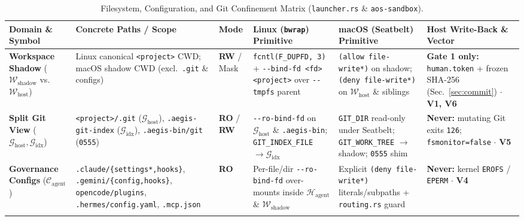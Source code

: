 \documentclass[10pt,journal,compsoc]{IEEEtran}
\begin{document}
\begin{table}[!t]
\centering
\caption{Filesystem, Configuration, and Git Confinement Matrix (\texttt{launcher.rs} \& \texttt{aos-sandbox}).}
\label{tab:vfs_map}
\vspace{-4pt}
\scriptsize
\setlength{\tabcolsep}{3.1pt}
\begin{tabularx}{\textwidth}{@{}>{\raggedright\arraybackslash}p{2.30cm}>{\raggedright\arraybackslash}p{3.10cm}lYY>{\raggedright\arraybackslash}p{2.95cm}@{}}
\toprule
\textbf{Domain \& Symbol} & \textbf{Concrete Paths / Scope} & \textbf{Mode} & \textbf{Linux (\texttt{bwrap}) Primitive} & \textbf{macOS (Seatbelt) Primitive} & \textbf{Host Write-Back \& Vector} \\
\midrule
\textbf{Workspace Shadow} ($\mathcal{W}_{\text{shadow}}$ vs.\ $\mathcal{W}_{\text{host}}$) & Linux canonical \texttt{<project>} CWD; macOS shadow CWD (excl.\ \texttt{.git} \& configs) & \textbf{RW} / Mask & \texttt{fcntl(F\_DUPFD, 3)} + \texttt{-\/-bind-fd <fd> <project>} over \texttt{-\/-tmpfs} parent & \texttt{(allow file-write*)} on shadow; \texttt{(deny file-write*)} on $\mathcal{W}_{\text{host}}$ \& siblings & \textbf{Gate 1 only:} \texttt{human.token} + frozen SHA-256 (Sec.~\ref{sec:commit}) $\cdot$ \textbf{V1, V6} \\
\addlinespace[2pt]
\textbf{Split Git View} ($\mathcal{G}_{\text{host}}, \mathcal{G}_{\text{idx}}$) & \texttt{<project>/.git} ($\mathcal{G}_{\text{host}}$), \texttt{.aegis-git-index} ($\mathcal{G}_{\text{idx}}$), \texttt{.aegis-bin/git} (\texttt{0555}) & \textbf{RO} / \textbf{RW} & \texttt{-\/-ro-bind-fd} on $\mathcal{G}_{\text{host}}$ \& \texttt{.aegis-bin}; \texttt{GIT\_INDEX\_FILE} $\to \mathcal{G}_{\text{idx}}$ & \texttt{GIT\_DIR} read-only under Seatbelt; \texttt{GIT\_WORK\_TREE} $\to$ shadow; \texttt{0555} shim & \textbf{Never:} mutating Git exits \texttt{126}; \texttt{fsmonitor=false} $\cdot$ \textbf{V5} \\
\addlinespace[2pt]
\textbf{Governance Configs} ($\mathcal{C}_{\text{agent}}$) & \texttt{.claude/\allowbreak\{settings*,\allowbreak hooks\}}, \texttt{.gemini/\allowbreak\{config,\allowbreak hooks\}}, \texttt{opencode/plugins}, \texttt{.hermes/config.yaml}, \texttt{.mcp.json} & \textbf{RO} & Per-file/dir \texttt{-\/-ro-bind-fd} over-mounts inside $\mathcal{H}_{\text{agent}}$ \& $\mathcal{W}_{\text{shadow}}$ & Explicit \texttt{(deny file-write*)} literals/subpaths + \texttt{routing.rs} guard & \textbf{Never:} kernel \texttt{EROFS} / \texttt{EPERM} $\cdot$ \textbf{V4} \\
\addlinespace[2pt]

\end{tabularx}
\end{table}
\end{document}
